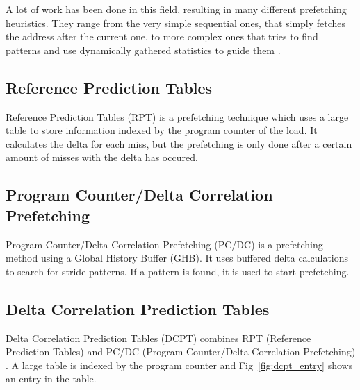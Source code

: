 A lot of work has been done in this field, resulting in many different prefetching heuristics. They
range from the very simple sequential ones, that simply fetches the address after the current one,
to more complex ones that tries to find patterns and use dynamically gathered statistics to guide
them \cite{prefetch_range}.

\subsection{Reference Prediction Tables}
Reference Prediction Tables (RPT) is a prefetching technique which uses a large table to store information indexed by the program counter of the load. It calculates the delta for each miss, but the prefetching is only done after a certain amount of misses with the delta has occured.

\subsection{Program Counter/Delta Correlation Prefetching}
Program Counter/Delta Correlation Prefetching (PC/DC) is a prefetching method using a Global History Buffer (GHB). It uses buffered delta calculations to search for stride patterns. If a pattern is found, it is used to start prefetching.

\subsection{Delta Correlation Prediction Tables} 
Delta Correlation Prediction Tables (DCPT) combines RPT (Reference Prediction Tables) and PC/DC
(Program Counter/Delta Correlation Prefetching) \cite{dcpt}. A large table is indexed by the program
counter and Fig~\ref{fig:dcpt_entry} shows an entry in the table.

\subsection{}



